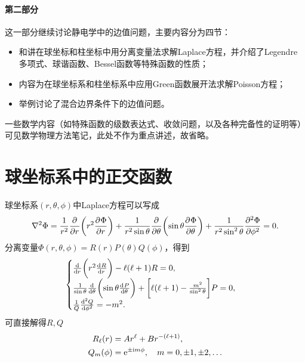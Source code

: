 \clearpage

\paragraph{第二部分}
这一部分继续讨论静电学中的边值问题，主要内容分为四节：
\begin{itemize}
    \item {}和讲在球坐标和柱坐标中用分离变量法求解Laplace方程，并介绍了Legendre多项式、球谐函数、Bessel函数等特殊函数的性质；
    \item {}内容为在球坐标系和柱坐标系中应用Green函数展开法求解Poisson方程；
    \item {}举例讨论了混合边界条件下的边值问题。
\end{itemize}
一些数学内容（如特殊函数的级数表达式、收敛问题，以及各种完备性的证明等）可见数学物理方法笔记，此处不作为重点讲述，故省略。


\section{球坐标系中的正交函数}
\label{sec:laplace equation in spherical coordinate}

球坐标系$(r,\theta,\phi)$中Laplace方程可以写成
\begin{equation}
    \label{eqn:Laplace in spherical}
    \lap\Phi=\frac1{r^2}\pp r\biggkh{r^2\pv\Phi r}+\frac1{r^2\sin\theta}\pp\theta\biggkh{\sin\theta\pv\Phi\theta}+\frac1{r^2\sin^2\theta}\pv[2]\Phi\phi=0.
\end{equation}
分离变量$\Phi(r,\theta,\phi)=R(r)P(\theta)Q(\phi)$，得到 
\[
    \begin{cases}
        \dd r\biggkh{r^2\dv Rr}-\ell(\ell+1)R=0,\\
        \frac1{\sin\theta}\dd\theta\biggkh{\sin\theta\dv P\theta}+\biggfkh{\ell(\ell+1)-\frac{m^2}{\sin^2\theta}}P=0,\\
        \frac1Q\dv[2]Q\phi=-m^2.
    \end{cases}
\]
可直接解得$R,Q$
\begin{align}
    R_\ell(r)&=Ar^\ell+Br^{-(\ell+1)},\\
    Q_m(\phi)&=\e{\pm\i m\phi},\quad m=0,\pm 1,\pm 2,\ldots
\end{align}

